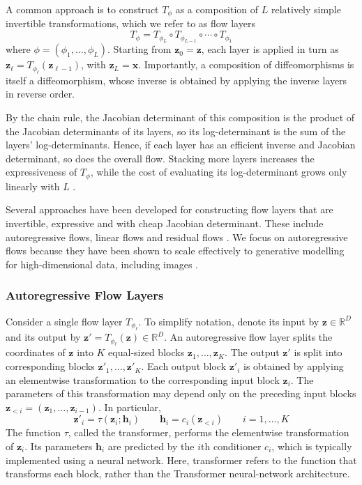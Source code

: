\documentclass[12pt,a4paper]{report}
\begin{document}
A common approach is to construct $T_{\phi}$ as a composition of $L$ relatively simple invertible transformations, which we refer to as flow layers
\begin{equation}
T_{\phi}
=
T_{\phi_L}
\circ
T_{\phi_{L-1}}
\circ
\cdots
\circ
T_{\phi_1}
\label{eq:NF_composition}
\end{equation}
where $\phi=(\phi_1,\ldots,\phi_L)$. Starting from $\mathbf{z}_0=\mathbf{z}$, each layer is applied in turn as $\mathbf{z}_{\ell}=T_{\phi_\ell}(\mathbf{z}_{\ell-1})$, with $\mathbf{z}_L=\mathbf{x}$. Importantly, a composition of diffeomorphisms is itself a diffeomorphism, whose inverse is obtained by applying the inverse layers in reverse order.

By the chain rule, the Jacobian determinant of this composition is the product of the Jacobian determinants of its layers, so its log-determinant is the sum of the layers' log-determinants. Hence, if each layer has an efficient inverse and Jacobian determinant, so does the overall flow. Stacking more layers increases the expressiveness of $T_{\phi}$, while the cost of evaluating its log-determinant grows only linearly with $L$ \parencite{NF_survey}.

Several approaches have been developed for constructing flow layers that are invertible, expressive and with cheap Jacobian determinant. These include autoregressive flows, linear flows and residual flows \parencite{NF_survey}. We focus on autoregressive flows because they have been shown to scale effectively to generative modelling for high-dimensional data, including images \parencite{TarFlow}.

\subsubsection{Autoregressive Flow Layers}
\label{subsubsec:autoregressive_flow_layers}
Consider a single flow layer $T_{\phi_\ell}$. To simplify notation,
denote its input by $\mathbf{z}\in\mathbb{R}^{D}$ and its output by
$\mathbf{z}'=T_{\phi_\ell}(\mathbf{z})\in\mathbb{R}^{D}$.
An autoregressive flow layer splits the coordinates of $\mathbf{z}$
into $K$ equal-sized blocks
$\mathbf{z}_1,\ldots,\mathbf{z}_K$. The output $\mathbf{z}'$ is split
into corresponding blocks
$\mathbf{z}'_1,\ldots,\mathbf{z}'_K$. Each output block
$\mathbf{z}'_i$ is obtained by applying an elementwise transformation
to the corresponding input block $\mathbf{z}_i$. The parameters of
this transformation may depend only on the preceding input blocks
$\mathbf{z}_{<i}=(\mathbf{z}_1,\ldots,\mathbf{z}_{i-1})$. In
particular,
\begin{equation}
\mathbf{z}'_i
=
\tau\left(\mathbf{z}_i;\mathbf{h}_i\right)
\qquad
\mathbf{h}_i
=
c_i\left(\mathbf{z}_{<i}\right)
\qquad
i=1,\ldots,K
\label{eq:autoregressive_flow_layer}
\end{equation}
The function $\tau$, called the transformer, performs the elementwise
transformation of $\mathbf{z}_i$. Its parameters $\mathbf{h}_i$ are
predicted by the $i$th conditioner $c_i$, which is typically
implemented using a neural network. Here, transformer refers to the
function that transforms each block, rather than the Transformer
neural-network architecture.
\end{document}
